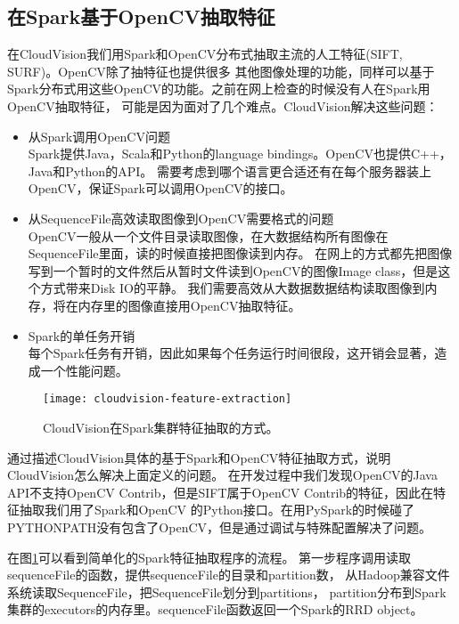 \subsection{在Spark基于OpenCV抽取特征}
\label{subsec:spark_opencv}
在CloudVision我们用Spark和OpenCV分布式抽取主流的人工特征(SIFT, SURF)。OpenCV除了抽特征也提供很多
其他图像处理的功能，同样可以基于Spark分布式用这些OpenCV的功能。之前在网上检查的时候没有人在Spark用OpenCV抽取特征，
可能是因为面对了几个难点。CloudVision解决这些问题：
\begin{itemize}
  \item 从Spark调用OpenCV问题 \\
        Spark提供Java，Scala和Python的language bindings。OpenCV也提供C++，Java和Python的API。
        需要考虑到哪个语言更合适还有在每个服务器装上OpenCV，保证Spark可以调用OpenCV的接口。
  \item 从SequenceFile高效读取图像到OpenCV需要格式的问题 \\
        OpenCV一般从一个文件目录读取图像，在大数据结构所有图像在SequenceFile里面，读的时候直接把图像读到内存。
        在网上的方式都先把图像写到一个暂时的文件然后从暂时文件读到OpenCV的图像Image class，但是这个方式带来Disk IO的平静。
        我们需要高效从大数据数据结构读取图像到内存，将在内存里的图像直接用OpenCV抽取特征。
  \item Spark的单任务开销 \\
        每个Spark任务有开销，因此如果每个任务运行时间很段，这开销会显著，造成一个性能问题。
\end{itemize}


\begin{figure}[h]
  \centering
    \texttt{[image: cloudvision-feature-extraction]}
  \caption{CloudVision在Spark集群特征抽取的方式。}
  \label{fig:cloudvision-feature-extraction}
\end{figure}
通过描述CloudVision具体的基于Spark和OpenCV特征抽取方式，说明CloudVision怎么解决上面定义的问题。
在开发过程中我们发现OpenCV的Java
API不支持OpenCV Contrib，但是SIFT属于OpenCV Contrib的特征，因此在特征抽取我们用了Spark和OpenCV
的Python接口。在用PySpark的时候碰了PYTHONPATH没有包含了OpenCV，但是通过调试与特殊配置解决了问题。

在图\ref{fig:cloudvision-feature-extraction}可以看到简单化的Spark特征抽取程序的流程。
第一步程序调用读取sequenceFile的函数，提供sequenceFile的目录和partition数，
从Hadoop兼容文件系统读取SequenceFile，把SequenceFile划分到partitions，
partition分布到Spark集群的executors的内存里。sequenceFile函数返回一个Spark的RRD object。

